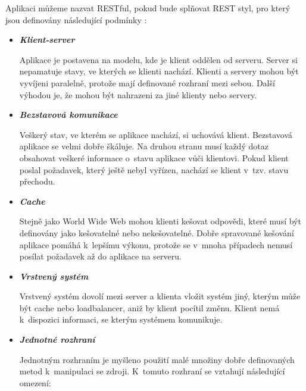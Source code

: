 \documentclass[11pt,twoside,a4paper]{book}
\begin{document}
Aplikaci můžeme nazvat RESTful, pokud bude splňovat REST styl, pro který jsou
definovány následující podmínky \cite{Burke14}:

\begin{itemize}
  \item \textbf{\textit{Klient-server}}

Aplikace je postavena na modelu, kde je klient oddělen od serveru. Server si
nepamatuje stavy, ve kterých se klienti nachází. Klienti a servery mohou být
vyvíjeni paralelně, protože mají definované rozhraní mezi sebou. Další výhodou
je, že mohou být nahrazeni za jiné klienty nebo servery.

\item \textbf{\textit{Bezstavová komunikace}}

Veškerý stav, ve kterém se aplikace nachází, si uchovává klient. Bezstavová
aplikace se velmi dobře škáluje. Na druhou stranu musí každý dotaz obsahovat veškeré informace o~stavu
aplikace vůči klientovi. Pokud klient poslal požadavek, který ještě nebyl vyřízen, nachází se
klient v~tzv. stavu přechodu.

\item \textbf{\textit{Cache}}

Stejně jako World Wide Web mohou klienti kešovat odpovědi, které musí být
definovány jako kešovatelné nebo nekešovatelné. Dobře spravované kešování aplikace
pomáhá k~lepšímu výkonu, protože se v~mnoha případech nemusí posílat požadavek až do
aplikace na serveru.

\item \textbf{\textit{Vrstvený systém}}

Vrstvený systém dovolí mezi server a klienta vložit systém jiný, kterým může být cache nebo
loadbalancer, aniž by klient pocítil změnu. Klient nemá k~dispozici informaci, se kterým
systémem komunikuje.

\item \textbf{\textit{Jednotné rozhraní}}

Jednotným rozhraním je myšleno použití malé množiny dobře definovaných metod
k~manipulaci se zdroji. K~tomuto rozhraní se vztahují následující omezení:


\end{itemize}
\end{document}

